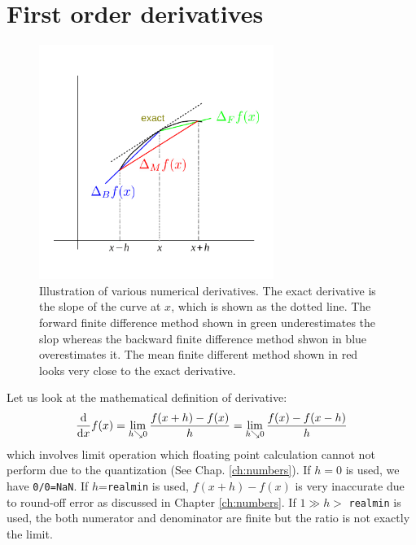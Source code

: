 \section{First order derivatives}\label{sec:dv-1st-order}
\begin{figure}
\centerline{\includegraphics[width=3in]{02.derivatives/diff.pdf}}
\caption{Illustration of various numerical derivatives.  The exact derivative is the slope of the curve at $x$, which is shown as the dotted line. The forward finite difference method shown in green  underestimates the slop whereas the backward finite difference method shwon in blue overestimates it.  The mean finite different method shown in red looks very close to the exact derivative.}
\label{fig:diff}
\end{figure}
  
Let us look at the mathematical definition of derivative:
\begin{equation}\label{eq:diff_exact}
\dv{x} f(x) = \lim_{h \searrow 0} \frac{f(x+h)-f(x)}{h} = \lim_{h \searrow 0} \frac{f(x)-f(x-h)}{h}
\end{equation}
which involves limit operation which floating point calculation cannot not perform due to the quantization (See Chap. \ref{ch:numbers}).
If $h=0$ is used, we have \texttt{0/0=NaN}.
If $h$=\texttt{realmin} is used, $f(x+h)-f(x)$ is very inaccurate due to round-off error as discussed in Chapter \ref{ch:numbers}.
If  $1 \gg h >$ \texttt{realmin} is used, the both numerator and denominator are finite but the ratio is not exactly the limit.  


